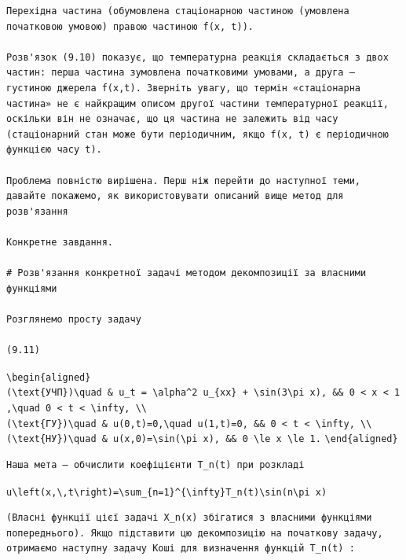 \documentclass[
  ukrainian,
]{article}
\begin{document}
\begin{verbatim}
Перехідна частина (обумовлена стаціонарною частиною (умовлена початковою умовою) правою частиною f(x, t)).

Розв'язок (9.10) показує, що температурна реакція складається з двох частин: перша частина зумовлена початковими умовами, а друга — густиною джерела f(x,t). Зверніть увагу, що термін «стаціонарна частина» не є найкращим описом другої частини температурної реакції, оскільки він не означає, що ця частина не залежить від часу (стаціонарний стан може бути періодичним, якщо f(x, t) є періодичною функцією часу t).

Проблема повністю вирішена. Перш ніж перейти до наступної теми, давайте покажемо, як використовувати описаний вище метод для розв'язання

Конкретне завдання.

# Розв'язання конкретної задачі методом декомпозиції за власними функціями

Розглянемо просту задачу

(9.11)
\end{verbatim}

\texttt{\textbackslash{}begin\{aligned\}}
\texttt{(\textbackslash{}text\{УЧП\})\textbackslash{}quad\ \&\ u\_t\ =\ \textbackslash{}alpha\^{}2\ u\_\{xx\}\ +\ \textbackslash{}sin(3\textbackslash{}pi\ x),\ \&\&\ 0\ \textless{}\ x\ \textless{}\ 1,\textbackslash{}quad\ 0\ \textless{}\ t\ \textless{}\ \textbackslash{}infty,\ \textbackslash{}\textbackslash{}}
\texttt{(\textbackslash{}text\{ГУ\})\textbackslash{}quad\ \&\ u(0,t)=0,\textbackslash{}quad\ u(1,t)=0,\ \&\&\ 0\ \textless{}\ t\ \textless{}\ \textbackslash{}infty,\ \textbackslash{}\textbackslash{}}
\texttt{(\textbackslash{}text\{НУ\})\textbackslash{}quad\ \&\ u(x,0)=\textbackslash{}sin(\textbackslash{}pi\ x),\ \&\&\ 0\ \textbackslash{}le\ x\ \textbackslash{}le\ 1.}
\texttt{\textbackslash{}end\{aligned\}}

\begin{verbatim}
Наша мета — обчислити коефіцієнти T_n(t) при розкладі
\end{verbatim}

\texttt{u\textbackslash{}left(x,\textbackslash{},t\textbackslash{}right)=\textbackslash{}sum\_\{n=1\}\^{}\{\textbackslash{}infty\}T\_n(t)\textbackslash{}sin(n\textbackslash{}pi\ x)}

\begin{verbatim}
(Власні функції цієї задачі X_n(x) збігатися з власними функціями попереднього). Якщо підставити цю декомпозицію на початкову задачу, отримаємо наступну задачу Коші для визначення функцій T_n(t) :
\end{verbatim}
\end{document}
